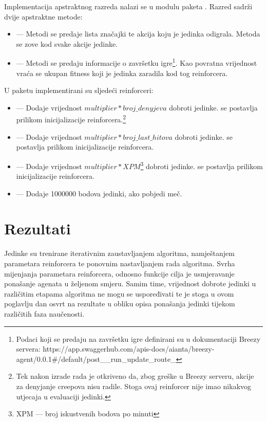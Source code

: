 \documentclass[times, utf8, zavrsni, numeric]{fer}
\begin{document}
Implementacija apstraktnog razreda  nalazi se u modulu
 paketa . Razred sadrži
dvije apstraktne metode:
\begin{itemize}
    \item {} --- Metodi se predaje lista značajki te akcija koju je
        jedinka odigrala. Metoda se zove kod svake akcije jedinke.
    \item {} --- Metodi se predaju informacije o završetku
        igre\footnote{Podaci koji se predaju na završetku igre definirani su u
        dokumentaciji Breezy servera:
        https://app.swaggerhub.com/apis-docs/aianta/breezy-agent/0.0.1\#/default/post\_\_run\_update\_route\_}.
        Kao povratna vrijednost vraća se ukupan fitness koji je jedinka zaradila
        kod tog reinforcera.
\end{itemize}

U paketu  implementirani su sljedeći
reinforceri:
\begin{itemize}
    \item {} --- Dodaje vrijednost
        $multiplier*broj\_denyjeva$ dobroti jedinke.  se
        postavlja prilikom inicijalizacije reinforcera.\footnote{Tek nakon
        izrade rada je otkriveno da, zbog greške u Breezy serveru, akcije za
        denyjanje creepova nisu radile. Stoga ovaj reinforcer nije imao nikakvog
        utjecaja u evaluaciji jedinki.}
    \item {} --- Dodaje vrijednost
        $multiplier*broj\_last\_hitova$ dobroti jedinke.  se
        postavlja prilikom inicijalizacije reinforcera.
    \item {} --- Dodaje vrijednost
        $multiplier*XPM$\footnote{XPM  --- broj
        iskustvenih bodova po minuti} dobroti jedinke.  se
        postavlja prilikom inicijalizacije reinforcera.
    \item {} --- Dodaje 1000000 bodova jedinki, ako pobjedi
        meč.
\end{itemize}


\chapter{Rezultati}\label{chapter:rezultati}

Jedinke su trenirane iterativnim zaustavljanjem algoritma, namještanjem
parametara reinforcera te ponovnim nastavljanjem rada algoritma. Svrha
mijenjanja parametara reinforcera, odnosno funkcije cilja je usmjeravanje
ponašanje agenata u željenom smjeru. Samim time, vrijednost dobrote jedinki u
različitim etapama algoritma ne mogu se uspoređivati te je stoga u ovom
poglavlju dan osvrt na rezultate u obliku opisa ponašanja jedinki tijekom
različitih faza naučenosti.
\end{document}
